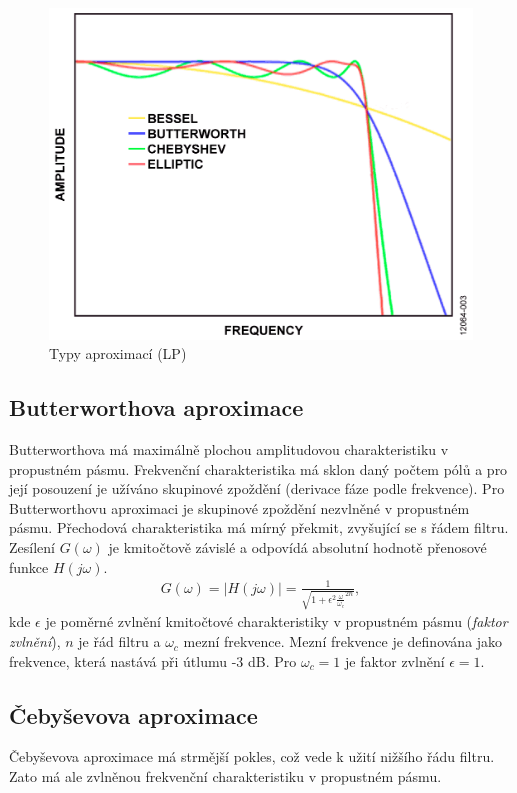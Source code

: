 \documentclass[twoside]{article}
\begin{document}
\begin{figure}[H]
\centering
\includegraphics[scale=0.3]{LGA98.png}
\caption{Typy aproximací (LP)\cite{2}}
\end{figure}
\subsection{Butterworthova aproximace}
Butterworthova má maximálně plochou amplitudovou charakteristiku v propustném pásmu. Frekvenční charakteristika má sklon daný počtem pólů a pro její posouzení je užíváno skupinové zpoždění (derivace fáze podle frekvence). Pro Butterworthovu aproximaci je skupinové zpoždění nezvlněné v propustném pásmu. Přechodová charakteristika má mírný překmit, zvyšující se s řádem filtru. Zesílení $G(\omega)$ je kmitočtově závislé a odpovídá absolutní hodnotě přenosové funkce $H(j\omega)$.
\begin{align*}
G(\omega) = |H(j\omega)| = \frac{1}{\sqrt{1 + \epsilon ^2 \frac{\omega}{\omega _c}^{2n}}},
\end{align*}
kde $\epsilon$ je poměrné zvlnění kmitočtové charakteristiky v propustném pásmu (\textit{faktor zvlnění}), $n$ je řád filtru a $\omega _c$ mezní frekvence. Mezní frekvence je definována jako frekvence, která nastává při útlumu -3 dB. Pro $\omega _c = 1$ je faktor zvlnění $\epsilon = 1$. 
\subsection{Čebyševova aproximace}
Čebyševova aproximace má strmější pokles, což vede k užití nižšího řádu filtru. Zato má ale zvlněnou frekvenční charakteristiku v propustném pásmu. 
\end{document}
